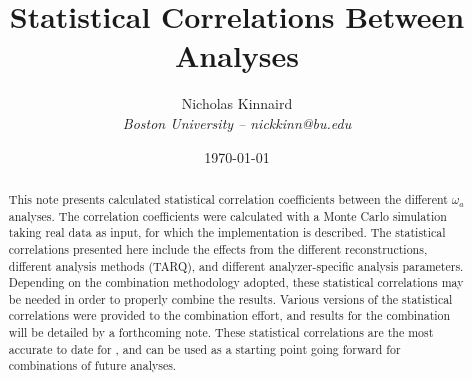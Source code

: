 \documentclass[12pt,letterpaper]{article}
\title{Statistical Correlations Between \Rone \wa Analyses}
\author{Nicholas Kinnaird \\ \small{\textit{Boston University -- nickkinn@bu.edu}}}
\date{\today}
\begin{document}
\maketitle

\begin{abstract}
	This note presents calculated statistical correlation coefficients between the different \Rone $\omega_{a}$ analyses. The correlation coefficients were calculated with a Monte Carlo simulation taking real data as input, for which the implementation is described. The statistical correlations presented here include the effects from the different reconstructions, different analysis methods (TARQ), and different analyzer-specific analysis parameters. Depending on the combination methodology adopted, these statistical correlations may be needed in order to properly combine the results. Various versions of the statistical correlations were provided to the combination effort, and results for the combination will be detailed by a forthcoming note. These statistical correlations are the most accurate to date for \Rone, and can be used as a starting point going forward for combinations of future \wa analyses.
\end{abstract}

\tableofcontents







% 


{}
\printbibliography

\end{document}
